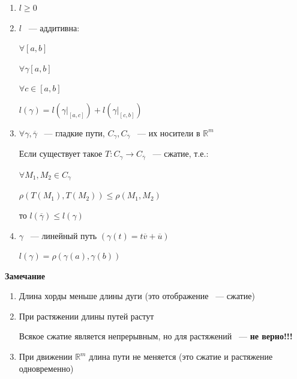 \documentclass{article}
\begin{document}
        \begin{enumerate}
        
            \item $l \geq 0$
            
            \item $l$ ~--- аддитивна:
           
                $\forall [a, b]$
                
                $\forall \gamma[a, b]$
                
                $\forall c \in [a, b]$
                
                $l(\gamma) = l\left(\gamma \bigg|_{[a, c]}\right) + l\left(\gamma \bigg|_{[c, b]}\right)$
            
            \item $\forall \gamma{,} \overline{\gamma}$ ~--- гладкие пути, $C_{\gamma}, C_{\overline{\gamma}}$ ~--- их носители в $\mathbb{R}^m$
                
                Если существует такое $T: C_{\gamma} \rightarrow C_{\overline{\gamma}}$ ~--- сжатие, т.е.:

                    $\forall M_1{,} M_2 \in C_{\gamma}$
                    
                    $\rho \left(T\left(M_1\right), T\left(M_2\right)\right) \leq \rho \left(M_1, M_2\right)$
                
                то $l(\overline{\gamma}) \leq l(\gamma)$
                
            \item $\gamma$ ~--- линейный путь $(\gamma(t) = t \overline{v} + \overline{u})$
            
                $l(\gamma) = \rho(\gamma(a), \gamma(b))$
                
        \end{enumerate}
            
        \textbf{Замечание}
        
        \begin{enumerate}
        
            \item Длина хорды меньше длины дуги (это отображение ~--- сжатие)
            
            \item При растяжении длины путей растут
            
                Всякое сжатие является непрерывным, но для растяжений ~--- \textbf{не верно!!!}
                
            \item При движении $\mathbb{R}^m$ длина пути не меняется (это сжатие и растяжение одновременно)
            
        \end{enumerate}
        
\end{document}
